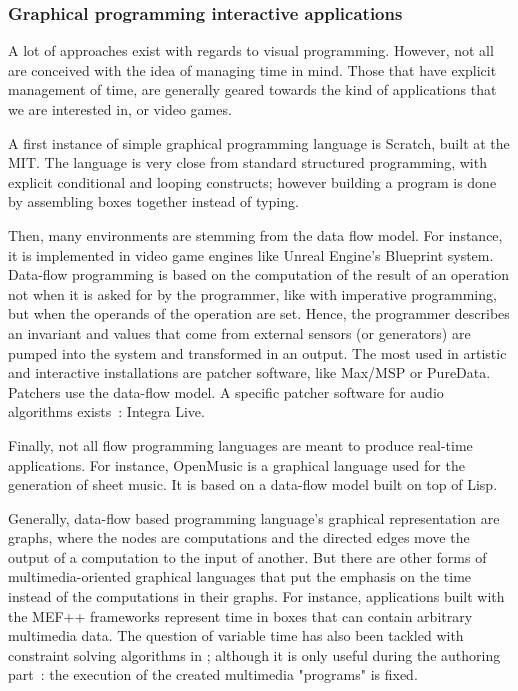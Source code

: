 \documentclass{sigchi}
\begin{document}
\subsubsection{Graphical programming interactive applications}
A lot of approaches exist with regards to visual programming. However, not all are conceived with the idea of managing time in mind. Those that have explicit management of time, are generally geared towards the kind of applications that we are interested in, or video games.

A first instance of simple graphical programming language is Scratch\cite{resnick2009scratch}, built at the MIT. The language is very close from standard structured programming, with explicit conditional and looping constructs; however building a program is done by assembling boxes together instead of typing.

Then, many environments are stemming from the data flow model. For instance, it is implemented in video game engines like Unreal Engine's Blueprint system\cite{shah2014mastering}. Data-flow programming is based on the computation of the result of an operation not when it is asked for by the programmer, like with imperative programming, but when the operands of the operation are set. Hence, the programmer describes an invariant and values that come from external sensors (or generators) are pumped into the system and transformed in an output.
The most used in artistic and interactive installations are patcher software, like Max/MSP or PureData. Patchers use the data-flow model. A specific patcher software for audio algorithms exists~: Integra Live\cite{bullock2011integra}.

Finally, not all flow programming languages are meant to produce real-time applications. For instance, OpenMusic\cite{bresson_openmusic:_2011} is a graphical language used for the generation of sheet music. It is based on a data-flow model built on top of Lisp.

Generally, data-flow based programming language's graphical representation are graphs, where the nodes are computations and the directed edges move the output of a computation to the input of another.
But there are other forms of multimedia-oriented graphical languages that put the emphasis on the time instead of the computations in their graphs. For instance, applications built with the MEF++ frameworks\cite{ackermann_direct_1994} represent time in boxes that can contain arbitrary multimedia data. The question of variable time has also been tackled with constraint solving algorithms in \cite{song_interactive_1999}; although it is only useful during the authoring part~: the execution of the created multimedia "programs" is fixed.
\end{document}
